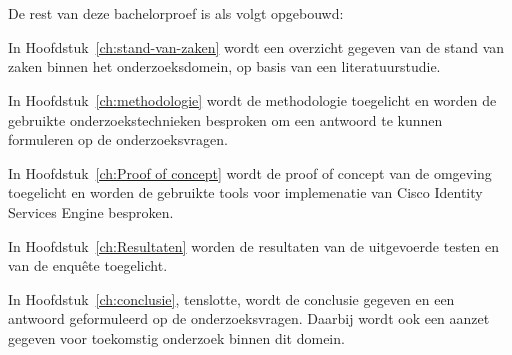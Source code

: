 \section{}
\label{sec:opzet-bachelorproef}


De rest van deze bachelorproef is als volgt opgebouwd:

In Hoofdstuk~\ref{ch:stand-van-zaken} wordt een overzicht gegeven van de stand van zaken binnen het onderzoeksdomein, op basis van een literatuurstudie.

In Hoofdstuk~\ref{ch:methodologie} wordt de methodologie toegelicht en worden de gebruikte onderzoekstechnieken besproken om een antwoord te kunnen formuleren op de onderzoeksvragen.

In Hoofdstuk~\ref{ch:Proof of concept} wordt de proof of concept van de omgeving toegelicht en worden de gebruikte tools voor implemenatie van Cisco Identity Services Engine besproken. 

In Hoofdstuk~\ref{ch:Resultaten} worden de resultaten van de uitgevoerde testen en van de enquête toegelicht.

In Hoofdstuk~\ref{ch:conclusie}, tenslotte, wordt de conclusie gegeven en een antwoord geformuleerd op de onderzoeksvragen. Daarbij wordt ook een aanzet gegeven voor toekomstig onderzoek binnen dit domein.